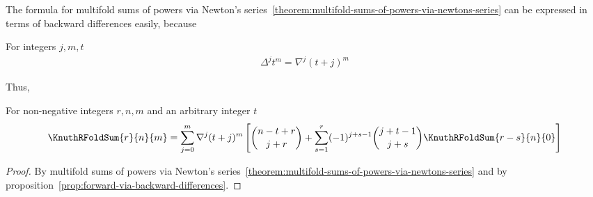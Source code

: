 The formula for multifold sums of powers via Newton's
series~\eqref{theorem:multifold-sums-of-powers-via-newtons-series}
can be expressed in terms of backward differences easily, because
\begin{proposition} For integers $j,m,t$
  \label{prop:forward-via-backward-differences}
  \begin{align*}
    \Delta^{j} t^{m} = \nabla^{j} (t+j)^{m}
  \end{align*}
\end{proposition}
Thus,
\begin{proposition}
  \label{prop:multifold-sums-of-powers-via-backward-difference}
  \begin{mdframed}
    For non-negative integers $r,n,m$ and an arbitrary integer $t$
    \begin{align*}
      \KnuthRFoldSum{r}{n}{m}
      = \sum_{j=0}^{m} \nabla^{j} (t+j)^{m} \left[ \binom{n-t+r}{j+r} +  \sum_{s=1}^{r} (-1)^{j+s-1} \binom{j+t-1}{j+s} \KnuthRFoldSum{r-s}{n}{0} \right]
    \end{align*}
  \end{mdframed}
  \begin{proof}
    By multifold sums of powers via Newton's
    series~\eqref{theorem:multifold-sums-of-powers-via-newtons-series} and
    by proposition~\eqref{prop:forward-via-backward-differences}.
  \end{proof}
\end{proposition}
